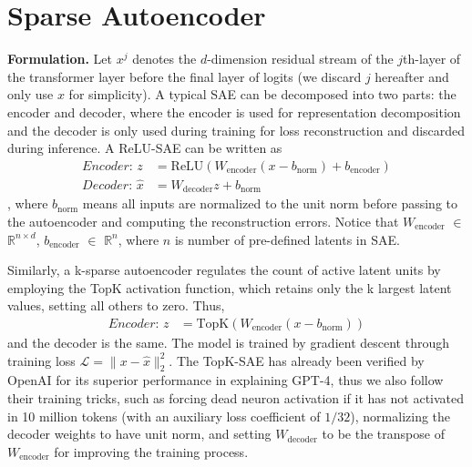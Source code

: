 \section{Sparse Autoencoder}\label{sec:method}

\textbf{Formulation.}
Let $x^j$ denotes the $d$-dimension residual stream of the $j$th-layer of the transformer layer before the final layer of logits (we discard $j$ hereafter and only use $x$ for simplicity). A typical SAE can be decomposed into two parts: the encoder and decoder, where the encoder is used for representation decomposition and the decoder is only used during training for loss reconstruction and discarded during inference. A ReLU-SAE can be written as 
\begin{equation}
\begin{aligned}
   \textit{Encoder: } z &= \text{ReLU}(W_{\text{encoder}}(x - b_{\text{norm}}) + b_{\text{encoder}}) \\
   \textit{Decoder: }  \hat{x} &= W_{\text{decoder}}z + b_{\text{norm}}
\end{aligned}
\end{equation}
, where $b_{\text{norm}}$ means all inputs are normalized to the unit norm before passing to the autoencoder and computing the reconstruction errors. 
Notice that $W_{\text{encoder}}$ $\in$ $\mathbb{R}^{n \times d}$, $b_{\text{encoder}}$ $\in$ $\mathbb{R}^n$, where $n$ is number of pre-defined latents in SAE.

Similarly, a k-sparse autoencoder \citep{makhzani2013k} regulates the count of active latent units by employing the TopK activation function, which retains only the k largest latent values, setting all others to zero. Thus,
\begin{equation}
\begin{aligned}
   \textit{Encoder: } z &= \text{TopK}(W_{\text{encoder}}(x - b_{\text{norm}}) )
\end{aligned}
\end{equation}
and the decoder is the same. The model is trained by gradient descent through training loss $\mathcal{L} = \|x - \hat{x}\|_2^2$. The TopK-SAE has already been verified by OpenAI \citep{gao2024scaling} for its superior performance in explaining GPT-4, thus we also follow their training tricks, such as forcing dead neuron activation if it has not activated in 10 million tokens (with an auxiliary loss coefficient of $1/32$), normalizing the decoder weights to have unit norm, and setting $W_{\text{decoder}}$ to be the transpose of $W_{\text{encoder}}$ for improving the training process.

